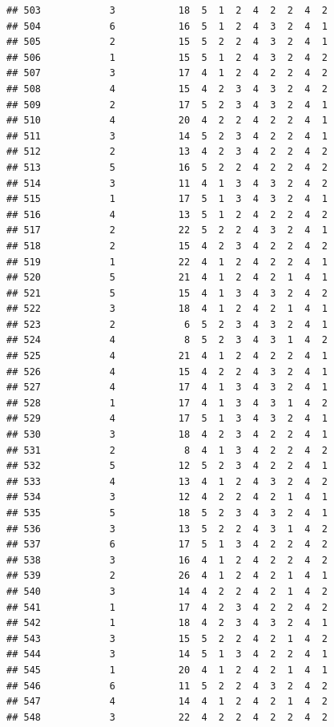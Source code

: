\documentclass[12pt,]{krantz}
\theoremstyle{definition}
\theoremstyle{definition}
\theoremstyle{remark}
\begin{document}
\begin{verbatim}
## 503            3           18  5  1  2  4  2  2  4  2
## 504            6           16  5  1  2  4  3  2  4  1
## 505            2           15  5  2  2  4  3  2  4  1
## 506            1           15  5  1  2  4  3  2  4  2
## 507            3           17  4  1  2  4  2  2  4  2
## 508            4           15  4  2  3  4  3  2  4  2
## 509            2           17  5  2  3  4  3  2  4  1
## 510            4           20  4  2  2  4  2  2  4  1
## 511            3           14  5  2  3  4  2  2  4  1
## 512            2           13  4  2  3  4  2  2  4  2
## 513            5           16  5  2  2  4  2  2  4  2
## 514            3           11  4  1  3  4  3  2  4  2
## 515            1           17  5  1  3  4  3  2  4  1
## 516            4           13  5  1  2  4  2  2  4  2
## 517            2           22  5  2  2  4  3  2  4  1
## 518            2           15  4  2  3  4  2  2  4  2
## 519            1           22  4  1  2  4  2  2  4  1
## 520            5           21  4  1  2  4  2  1  4  1
## 521            5           15  4  1  3  4  3  2  4  2
## 522            3           18  4  1  2  4  2  1  4  1
## 523            2            6  5  2  3  4  3  2  4  1
## 524            4            8  5  2  3  4  3  1  4  2
## 525            4           21  4  1  2  4  2  2  4  1
## 526            4           15  4  2  2  4  3  2  4  1
## 527            4           17  4  1  3  4  3  2  4  1
## 528            1           17  4  1  3  4  3  1  4  2
## 529            4           17  5  1  3  4  3  2  4  1
## 530            3           18  4  2  3  4  2  2  4  1
## 531            2            8  4  1  3  4  2  2  4  2
## 532            5           12  5  2  3  4  2  2  4  1
## 533            4           13  4  1  2  4  3  2  4  2
## 534            3           12  4  2  2  4  2  1  4  1
## 535            5           18  5  2  3  4  3  2  4  1
## 536            3           13  5  2  2  4  3  1  4  2
## 537            6           17  5  1  3  4  2  2  4  2
## 538            3           16  4  1  2  4  2  2  4  2
## 539            2           26  4  1  2  4  2  1  4  1
## 540            3           14  4  2  2  4  2  1  4  2
## 541            1           17  4  2  3  4  2  2  4  2
## 542            1           18  4  2  3  4  3  2  4  1
## 543            3           15  5  2  2  4  2  1  4  2
## 544            3           14  5  1  3  4  2  2  4  1
## 545            1           20  4  1  2  4  2  1  4  1
## 546            6           11  5  2  2  4  3  2  4  2
## 547            4           14  4  1  2  4  2  1  4  2
## 548            3           22  4  2  2  4  2  2  4  2

\end{verbatim}
\end{document}
